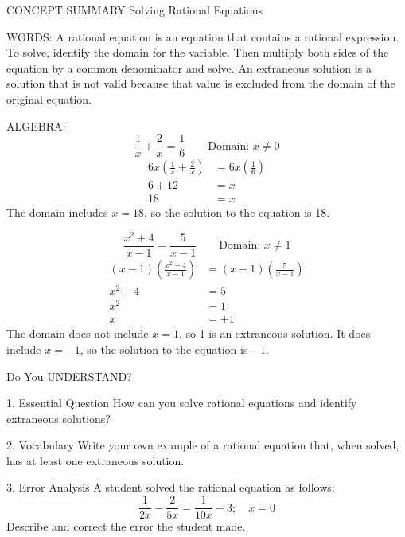 \documentclass{article}
\newenvironment{concept-summary}{}{}    %
\newcommand{\answer}[1]{}               %
\begin{document}
\begin{concept-summary}
CONCEPT SUMMARY Solving Rational Equations

WORDS: A rational equation is an equation that contains a rational expression. To solve, identify the domain for the variable. Then multiply both sides of the equation by a common denominator and solve. An extraneous solution is a solution that is not valid because that value is excluded from the domain of the original equation.

ALGEBRA:
\[
\frac{1}{x}+\frac{2}{x}=\frac{1}{6}\qquad\text{Domain: }x\neq0
\]
\begin{align*}
6x\left(\frac{1}{x}+\frac{2}{x}\right)&=6x\left(\frac{1}{6}\right)\\
6+12&=x\\
18&=x
\end{align*}
The domain includes $x=18$, so the solution to the equation is 18.

\[
\frac{x^2+4}{x-1}=\frac{5}{x-1}\qquad\text{Domain: }x\neq1
\]
\begin{align*}
(x-1)\left(\frac{x^2+4}{x-1}\right)&=(x-1)\left(\frac{5}{x-1}\right)\\
x^2+4&=5\\
x^2&=1\\
x&=\pm1
\end{align*}
The domain does not include $x=1$, so 1 is an extraneous solution. It does include $x=-1$, so the solution to the equation is $-1$.

Do You UNDERSTAND?

1. Essential Question How can you solve rational equations and identify extraneous solutions?
\answer{Begin by finding the LCD of all the terms, then multiply each term by the LCD, then simplify. Lastly, substitute the solution into the original equation to see if any of the terms are undefined as a result. If so, that solution cannot be an element of the domain and is considered extraneous.}

2. Vocabulary Write your own example of a rational equation that, when solved, has at least one extraneous solution.
\answer{Sample: $\frac{2}{x+1}-\frac{1}{x-1}=\frac{-2}{x^2-1}$}

3. Error Analysis A student solved the rational equation as follows:
\[
\frac{1}{2x}-\frac{2}{5x}=\frac{1}{10x}-3;\quad x=0
\]
Describe and correct the error the student made.
\answer{The student did not ensure that the solution is valid. This solution is extraneous, and there is no solution to the equation.}


\end{concept-summary}
\end{document}

